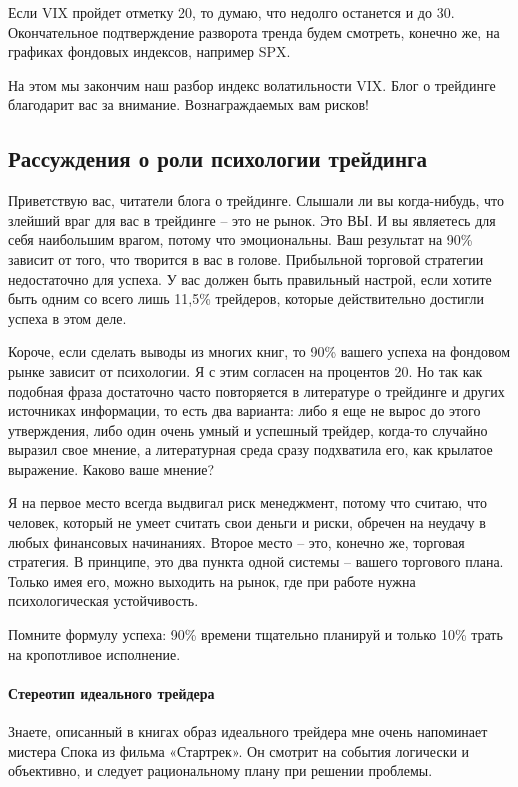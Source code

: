 \documentclass[a5paper]{article}
\begin{document}
Если VIX пройдет отметку 20, то думаю, что недолго останется и до 30. Окончательное подтверждение разворота тренда будем смотреть, конечно же, на графиках фондовых индексов, например SPX.

На этом мы закончим наш разбор индекс волатильности VIX. Блог о трейдинге благодарит вас за внимание. Вознаграждаемых вам рисков!

\subsection{Рассуждения о роли психологии трейдинга}

Приветствую вас, читатели блога о трейдинге. Слышали ли вы когда-нибудь, что злейший враг для вас в трейдинге – это не рынок. Это ВЫ. И вы являетесь для себя наибольшим врагом, потому что эмоциональны. Ваш результат на 90\% зависит от того, что творится в вас в голове. Прибыльной торговой стратегии недостаточно для успеха. У вас должен быть правильный настрой, если хотите быть одним со всего лишь 11,5\% трейдеров, которые действительно достигли успеха в этом деле.

Короче, если сделать выводы из многих книг, то 90\% вашего успеха на фондовом рынке зависит от психологии. Я с этим согласен на процентов 20. Но так как подобная фраза достаточно часто повторяется в литературе о трейдинге и других источниках информации, то есть два варианта: либо я еще не вырос до этого утверждения, либо один очень умный и успешный трейдер, когда-то случайно выразил свое мнение, а литературная среда сразу подхватила его, как крылатое выражение. Каково ваше мнение?

Я на первое место всегда выдвигал риск менеджмент, потому что считаю, что человек, который не умеет считать свои деньги и риски, обречен на неудачу в любых финансовых начинаниях. Второе место – это, конечно же, торговая стратегия. В принципе, это два пункта одной системы – вашего торгового плана. Только имея его, можно выходить на рынок, где при работе нужна психологическая устойчивость.

Помните формулу успеха: 90\% времени тщательно планируй и только 10\%
                          трать на кропотливое исполнение.

\paragraph{Стереотип идеального трейдера}

Знаете, описанный в книгах образ идеального трейдера мне очень напоминает мистера Спока из фильма «Стартрек». Он смотрит на события логически и объективно, и следует рациональному плану при решении проблемы.
\end{document}
